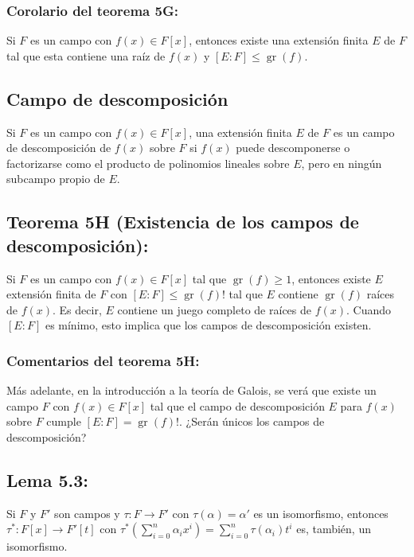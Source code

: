 \documentclass{article}
\DeclareMathOperator{\gr}{gr}
\begin{document}
\subsubsection*{\color{red} Corolario del teorema 5G:}

Si $F$ es un campo con $f(x)\in F[x]$, entonces existe una extensión finita $E$ de $F$ tal que esta contiene una raíz de $f(x)$ y $[E:F]\leq \gr(f)$. 

\subsection*{\color{violet} Campo de descomposición}

Si $F$ es un campo con $f(x)\in F[x]$, una extensión finita $E$ de $F$ es un campo de descomposición de $f(x)$ sobre $F$ si $f(x)$ puede descomponerse o factorizarse como el producto de polinomios lineales sobre $E$, pero en ningún subcampo propio de $E$. 

\subsection*{\color{red} Teorema 5H (Existencia de los campos de descomposición):}

Si $F$ es un campo con $f(x)\in F[x]$ tal que $\gr(f)\geq 1$, entonces existe $E$ extensión finita de $F$ con $[E:F]\leq \gr(f)!$ tal que $E$ contiene $\gr(f)$ raíces de $f(x)$. Es decir, $E$ contiene un juego completo de raíces de $f(x)$.	Cuando $[E:F]$ es mínimo, esto implica que los campos de descomposición existen.

\subsubsection*{\color{teal} Comentarios del teorema 5H:}

Más adelante, en la introducción a la teoría de Galois, se verá que existe un campo $F$ con $f(x)\in F[x]$ tal que el campo de descomposición $E$ para $f(x)$ sobre $F$ cumple $
[E:F]=\gr(f)!$. ¿Serán únicos los campos de descomposición?

\subsection*{\color{blue} Lema 5.3:}

Si $F$ y $F'$ son campos y $\tau:F\to F'$ con $\tau(\alpha)=\alpha'$ es un isomorfismo, entonces $\tau^{*}:F[x]\to F'[t]$ con $\displaystyle\tau^{*}\left(\sum_{i=0}^{n}\alpha_ix^i\right)=\sum_{i=0}^{n}\tau(\alpha_i)t^i$ es, también, un isomorfismo.
\end{document}
